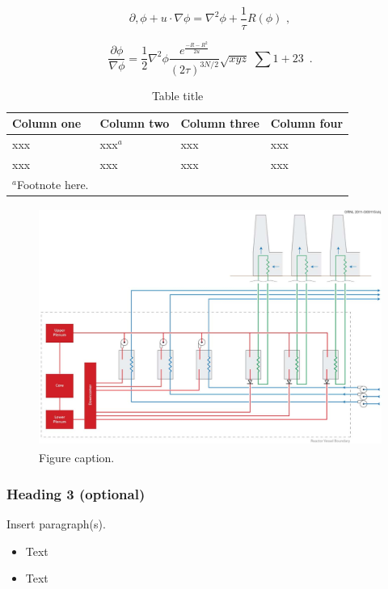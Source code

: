 \documentclass[11pt,letterpaper,english]{article}
\begin{document}
\begin{equation} \label{Eq. 1} 
\partial ,\phi +u\cdot \nabla \phi =\nabla ^{2} \phi +\frac{1}{\tau } R\left(\phi \right)\, \, ,
\end{equation} 


\begin{equation} \label{Eq. 2} 
\frac{\partial \phi }{\nabla \phi } =\frac{1}{2} \nabla ^{2} \phi \frac{e^{\frac{-R-R^{2} }{2u} } }{\left(2\tau \right)^{3N/2} } \sqrt{xyz} \, \, \sum 1+23\, \, \, . 
\end{equation} 

\begin{table}[h]
\centering
\caption{Table title}
\label{Tab1}
\begin{tabular}{llll} \\ \hline 
\textbf{Column one} & \textbf{Column two} & \textbf{Column three} & \textbf{Column four} \\ \hline 
 xxx & xxx\textit{${}^{a}$} & xxx & xxx \\ \hline 
xxx & xxx & xxx & xxx \\ \hline 
{\textit{$^{a}$}Footnote here.} \\
\end{tabular}
\end{table}


\begin{figure}
\centering
\includegraphics[width=4.52in, height=3.08in, keepaspectratio=true]{image1.jpg}
\caption{Figure caption.}
\label{Fig1}
\end{figure}

\subsubsection{Heading 3 (optional)}

Insert paragraph(s).


\begin{itemize}
\setlength{\itemsep}{-14pt}
\item Text \\ 
\item Text \\
\end{itemize} 
\vspace{-.15in}
\end{document}
